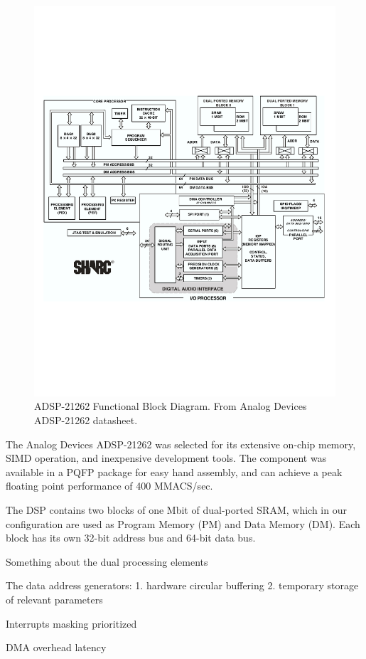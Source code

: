 \begin{figure}[h!]
\begin{center}
\includegraphics[scale=0.7]{adsp21262.pdf}
\end{center}
\caption{ADSP-21262 Functional Block Diagram. From Analog Devices ADSP-21262 datasheet.}
\label{adsp21262}
\end{figure}

The Analog Devices ADSP-21262 was selected for its extensive on-chip memory, SIMD operation, and inexpensive development tools. The component was available in a PQFP package for easy hand assembly, and can achieve a peak floating point performance of 400 MMACS/sec. 

The DSP contains two blocks of one Mbit of dual-ported SRAM, which in our configuration are used as Program Memory (PM) and Data Memory (DM). Each block has its own 32-bit address bus and 64-bit data bus. 

Something about the dual processing elements

The data address generators:
   1. hardware circular buffering
   2. temporary storage of relevant parameters

Interrupts
   masking
   prioritized

DMA
   overhead
   latency



